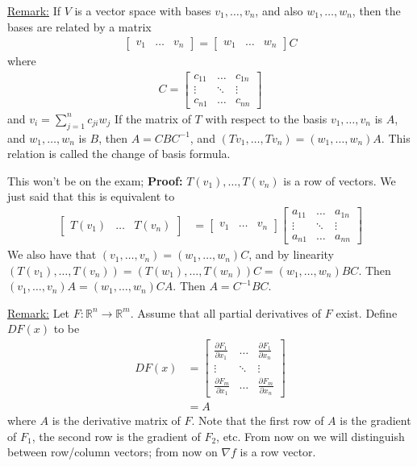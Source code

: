 \documentclass{article}
\newcommand*{\rr}{\mathbb{R}}%
\begin{document}
\underline{Remark:} If $V$ is a vector space with bases $v_1,\dots,v_n$, and also $w_1,\dots,w_n$, then the bases are related by a matrix \begin{align*}
    \begin{bmatrix}
        v_1 & \dots & v_n
    \end{bmatrix}=\begin{bmatrix}
        w_1 & \dots & w_n
    \end{bmatrix}C
\end{align*} where \begin{align*}
    C=\begin{bmatrix}
        c_{11} & \dots & c_{1n}\\
        \vdots & \ddots & \vdots\\
        c_{n1} & \dots & c_{nn}
    \end{bmatrix} 
\end{align*} and $v_i=\sum_{j=1}^{n}c_{ji}w_j$ If the matrix of $T$ with respect to the basis $v_1,\dots,v_n$ is $A$, and $w_1,\dots,w_n$ is $B$, then $A=CBC^{-1}$, and $(Tv_1,\dots,Tv_n)=(w_1,\dots,w_n)A$. This relation is called the change of basis formula.

This won't be on the exam; \textbf{Proof:} $T(v_1),\dots,T(v_n)$ is a row of vectors. We just said that this is equivalent to \begin{align*}
    \begin{bmatrix}
        T(v_1) & \dots & T(v_n)
    \end{bmatrix}&=
    \begin{bmatrix}
        v_1 & \dots & v_n
    \end{bmatrix}\begin{bmatrix}
        a_{11} & \dots & a_{1n}\\
        \vdots & \ddots & \vdots\\
        a_{n1} & \dots & a_{nn}
    \end{bmatrix}
\end{align*} We also have that $(v_1,\dots,v_n)=(w_1,\dots,w_n)C$, and by linearity $(T(v_1),\dots,T(v_n))=(T(w_1),\dots,T(w_n))C=(w_1,\dots,w_n)BC$. Then $(v_1,\dots,v_n)A=(w_1,\dots,w_n)CA$. Then $A=C^{-1}BC$.

\underline{Remark:} Let $F:\rr^n\to \rr^m$. Assume that all partial derivatives of $F$ exist. Define $DF(x)$ to be \begin{align*}
    DF(x)&=\begin{bmatrix}
        \frac{\partial F_1}{\partial x_1} & \dots & \frac{\partial F_1}{\partial x_n}\\
        \vdots & \ddots & \vdots\\
        \frac{\partial F_m}{\partial x_1} & \dots & \frac{\partial F_m}{\partial x_n}
    \end{bmatrix}\\
    &=A
\end{align*} where $A$ is the derivative matrix of $F$. Note that the first row of $A$ is the gradient of $F_1$, the second row is the gradient of $F_2$, etc. From now on we will distinguish between row/column vectors; from now on $\nabla f$ is a row vector.
\end{document}
